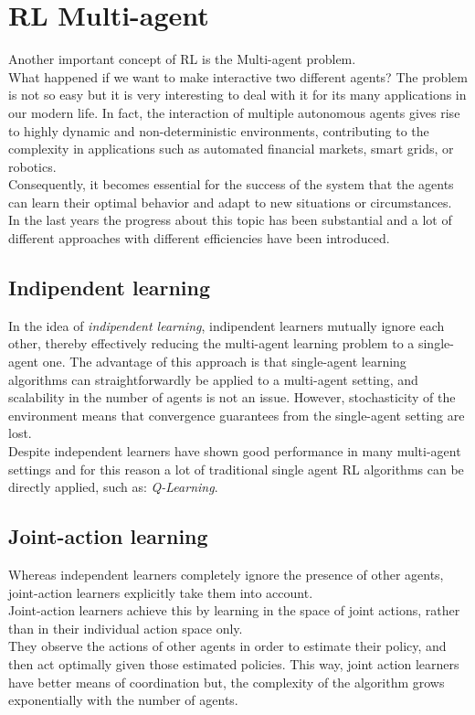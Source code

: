 \documentclass[]{report}
\begin{document}
\section{ RL Multi-agent }
Another important concept of RL is the Multi-agent problem.\\
What happened if we want to make interactive two different agents? The problem is not so easy but it is very interesting to deal with it for its many applications in our modern life.
In fact, the interaction of multiple autonomous agents gives rise to highly dynamic and non-deterministic environments, contributing to the complexity in applications such as automated financial markets, smart grids, or robotics.\\
Consequently, it becomes essential for the success of the system that the agents can learn their optimal behavior and adapt to new situations or circumstances.\\
In the last years the progress about this topic has been substantial and a lot of different approaches with different efficiencies have been introduced.

\subsection{Indipendent learning}
In the idea of \emph{indipendent learning}, indipendent learners mutually  ignore  each  other, thereby  effectively reducing  the  multi-agent learning problem to a single-agent one.
The advantage of this approach is that single-agent learning algorithms can straightforwardly be applied to a multi-agent setting, and scalability in the number of agents is not an issue.
However, stochasticity of the environment means that convergence guarantees from the single-agent setting are lost.\\
Despite independent learners have shown good performance in many multi-agent settings and for this reason a lot of traditional single agent RL algorithms can be directly applied, such as: \emph{Q-Learning}.

\subsection{Joint-action learning}
Whereas independent learners completely ignore the presence of other agents, joint-action learners explicitly take them into account.\\ Joint-action learners achieve this by learning in the space of joint actions, rather than in their individual action space only.\\
They observe the actions of other agents in order to estimate their policy, and then act optimally given those estimated policies. This way, joint action learners have better means of coordination but, the complexity of the algorithm grows exponentially with the number of agents. 
\end{document}
